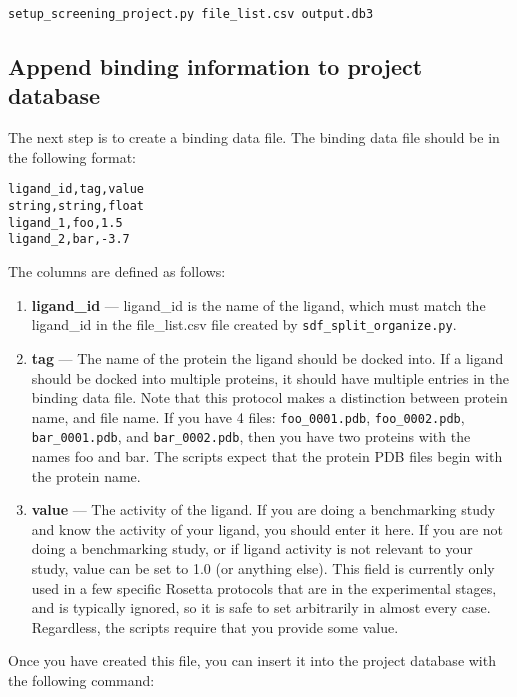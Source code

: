 \begin{verbatim}
setup_screening_project.py file_list.csv output.db3 
\end{verbatim}

\subsection{Append binding information to project database}

The next step is to create a binding data file. The binding data file should be in the following format:

\begin{verbatim}
ligand_id,tag,value
string,string,float
ligand_1,foo,1.5
ligand_2,bar,-3.7
\end{verbatim}

The columns are defined as follows:

\begin{enumerate}
\def\labelenumi{\arabic{enumi}.}
\item \textbf{ligand\_id} --- ligand\_id is the name of the ligand, which must match the ligand\_id in the file\_list.csv file created by \texttt{sdf\_split\_organize.py}.
\item \textbf{tag} --- The name of the protein the ligand should be docked into. If a ligand should be docked into multiple proteins, it should have multiple entries in the binding data file.
  Note that this protocol makes a distinction between protein name, and file name.
  If you have 4 files: \texttt{foo\_0001.pdb}, \texttt{foo\_0002.pdb}, \texttt{bar\_0001.pdb}, and \texttt{bar\_0002.pdb}, then you have two proteins with the names foo and bar.
  The scripts expect that the protein \ac{PDB} files begin with the protein name.
\item \textbf{value} --- The activity of the ligand. If you are doing a benchmarking study and know the activity of your ligand, you should enter it here.
  If you are not doing a benchmarking study, or if ligand activity is not relevant to your study, value can be set to 1.0 (or anything else). 
  This field is currently only used in a few specific Rosetta protocols that are in the experimental stages, and is typically ignored, so it is safe to set arbitrarily in almost every case.
  Regardless, the scripts require that you provide some value.
\end{enumerate}

Once you have created this file, you can insert it into the project
database with the following command:

